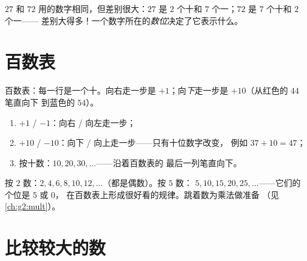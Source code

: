 \begin{example}\label{ex:g1:tens:place}
$27$ 和 $72$ 用的数字相同，但差别很大：$27$ 是
$2$ 个十和 $7$ 个一；$72$ 是 $7$ 个十和 $2$ 个一——
差别大得多！一个数字所在的\emph{数位}决定了它表示什么。
\end{example}

\section{百数表}

\begin{omfigure}

{\small 百数表：每一行是一个十。向右走一步是
$+1$；向\emph{下}走一步是 $+10$（从红色的 $44$ 笔直向下
到蓝色的 $54$）。}
\end{omfigure}

\begin{method}[在百数表上移动]\label{met:g1:tens:grid}
\begin{enumerate}
  \item $+1$ / $-1$：向右 / 向左走一步；
  \item $+10$ / $-10$：向下 / 向上走一步——只有十位数字改变，
        例如 $37 + 10 = 47$；
  \item 按十数：$10, 20, 30, \dots$——沿着百数表的
        最后一列笔直向下。
\end{enumerate}
\end{method}

\begin{example}[按 2 和按 5 数数]\label{ex:g1:tens:skip}
按 $2$ 数：$2, 4, 6, 8, 10, 12, \dots$（都是偶数）。按 $5$ 数：
$5, 10, 15, 20, 25, \dots$——它们的个位是 $5$ 或 $0$，
在百数表上形成很好看的规律。跳着数为乘法做准备
（见\cref{ch:g2:mult}）。
\end{example}

\section{比较较大的数}

